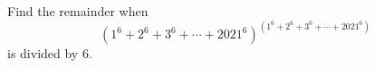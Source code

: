 Find the remainder when
\[\left(1^6+2^6+3^6+\cdots+2021^6\right)^{\left(1^6+2^6+3^6+\cdots+2021^6\right)}\]
is divided by $6$.
